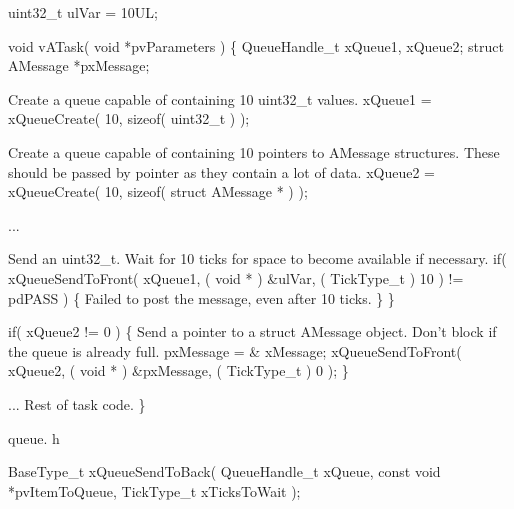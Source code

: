 \begin{DoxyPre} uint32\_t ulVar = 10UL;\end{DoxyPre}



\begin{DoxyPre} void vATask( void *pvParameters )
 \{
 QueueHandle\_t xQueue1, xQueue2;
 struct AMessage *pxMessage;\end{DoxyPre}



\begin{DoxyPre}Create a queue capable of containing 10 uint32\_t values.
    xQueue1 = xQueueCreate( 10, sizeof( uint32\_t ) );\end{DoxyPre}



\begin{DoxyPre}Create a queue capable of containing 10 pointers to AMessage structures.
These should be passed by pointer as they contain a lot of data.
    xQueue2 = xQueueCreate( 10, sizeof( struct AMessage * ) );\end{DoxyPre}



\begin{DoxyPre}...
\begin{DoxyVerb}if( xQueue1 != 0 )
{
\end{DoxyVerb}

Send an uint32\_t.  Wait for 10 ticks for space to become
available if necessary.
        if( xQueueSendToFront( xQueue1, ( void * ) \&ulVar, ( TickType\_t ) 10 ) != pdPASS )
        \{
Failed to post the message, even after 10 ticks.
        \}
    \}\end{DoxyPre}



\begin{DoxyPre}    if( xQueue2 != 0 )
    \{
Send a pointer to a struct AMessage object.  Don't block if the
queue is already full.
        pxMessage = \& xMessage;
        xQueueSendToFront( xQueue2, ( void * ) \&pxMessage, ( TickType\_t ) 0 );
    \}\end{DoxyPre}



\begin{DoxyPre}... Rest of task code.
 \}
 \end{DoxyPre}


queue. h 
\begin{DoxyPre}
 BaseType\_t xQueueSendToBack(
                                   QueueHandle\_t    xQueue,
                                   const void       *pvItemToQueue,
                                   TickType\_t       xTicksToWait
                               );
   \end{DoxyPre}


